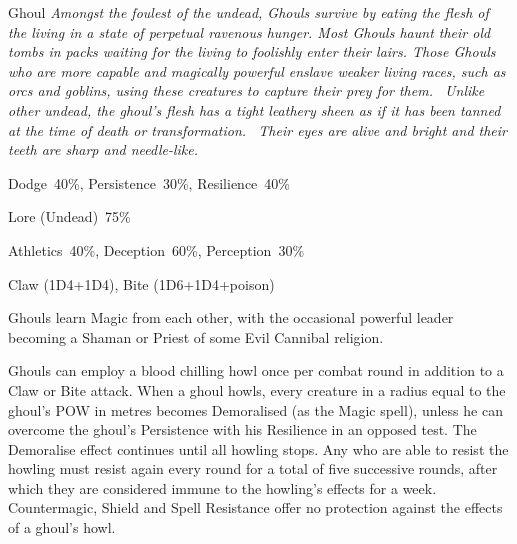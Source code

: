 \begin{monsterbox}{Ghoul}
	\textit{Amongst the foulest of the undead, Ghouls survive by eating the flesh of the living in a state of perpetual ravenous hunger. Most Ghouls haunt their old tombs in packs waiting for the living to foolishly enter their lairs. Those Ghouls who are more capable and magically powerful enslave weaker living races, such as orcs and goblins, using these creatures to capture their prey for them.  Unlike other undead, the ghoul’s flesh has a tight leathery sheen as if it has been tanned at the time of death or transformation.  Their eyes are alive and bright and their teeth are sharp and needle-like.}\\
	\rpghline
	\basics[%
        hitpoints  = 12, 
	majorwound = 6,
	damagemodifier = +1D4,
	powerpoints = 11,
	movementrate = 15m,
	armor = None,
	plunderrating = 1
	]
	\rpghline%
	\stats[ %
		STR = 4D6   (14),
		CON = 3D6   (11),
		DEX = 3D6   (11),
		SIZ = 2D6+6 (13),
		INT = 3D6   (11),
		POW = 3D6   (11),
		CHA = 1D6   (4)
	]
	\rpghline
	\begin{rpg-monsteraction}[Resistances]
		Dodge~40\%, Persistence~30\%, Resilience~40\%
	\end{rpg-monsteraction}
	\begin{rpg-monsteraction}[Knowledge]
		Lore (Undead)~75\%
	\end{rpg-monsteraction}
	\begin{rpg-monsteraction}[Practical]
		Athletics~40\%, Deception~60\%, Perception~30\%
	\end{rpg-monsteraction}
	\begin{rpg-monsteraction}
		Claw (1D4+1D4), Bite (1D6+1D4+poison)
	\end{rpg-monsteraction}
	\begin{rpg-monsteraction}[Magic]
		Ghouls learn Magic from each other, with the occasional powerful leader becoming a Shaman or Priest of some Evil Cannibal religion.
	\end{rpg-monsteraction}
	\begin{rpg-monsteraction}
		Ghouls can employ a blood chilling howl once per combat round in addition to a Claw or Bite attack. When a ghoul howls, every creature in a radius equal to the ghoul’s POW in metres becomes Demoralised (as the Magic spell), unless he can overcome the ghoul’s Persistence with his Resilience in an opposed test. The Demoralise effect continues until all howling stops. Any who are able to resist the howling must resist again every round for a total of five successive rounds, after which they are considered immune to the howling’s effects for a week. Countermagic, Shield and Spell Resistance offer no protection against the effects of a ghoul’s howl. 

\end{rpg-monsteraction}
\end{monsterbox}
